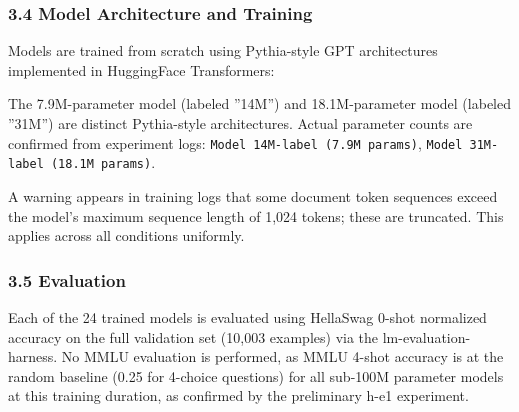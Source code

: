 \subsubsection{3.4 Model Architecture and Training}

Models are trained from scratch using Pythia-style GPT architectures implemented in HuggingFace Transformers:

\begin{table}[htbp]
\centering
{}
\end{table}

The 7.9M-parameter model (labeled ''14M'') and 18.1M-parameter model (labeled ''31M'') are distinct Pythia-style architectures. Actual parameter counts are confirmed from experiment logs: \texttt{Model 14M-label (7.9M params)}, \texttt{Model 31M-label (18.1M params)}.

A warning appears in training logs that some document token sequences exceed the model's maximum sequence length of 1,024 tokens; these are truncated. This applies across all conditions uniformly.

\subsubsection{3.5 Evaluation}

Each of the 24 trained models is evaluated using HellaSwag 0-shot normalized accuracy on the full validation set (10,003 examples) via the lm-evaluation-harness. No MMLU evaluation is performed, as MMLU 4-shot accuracy is at the random baseline (0.25 for 4-choice questions) for all sub-100M parameter models at this training duration, as confirmed by the preliminary h-e1 experiment.

